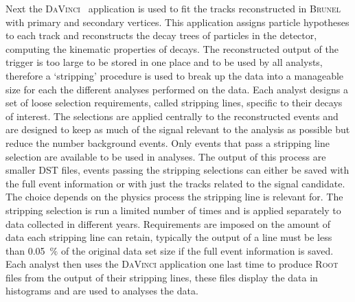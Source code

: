 Next the \textsc{DaVinci}~\cite{DV} application is used to fit the tracks reconstructed in \textsc{Brunel} with primary and secondary vertices. This application assigns particle hypotheses to each track and reconstructs the decay trees of particles in the detector, computing the kinematic properties of decays. The reconstructed output of the trigger is too large to be stored in one place and to be used by all analysts, therefore a `stripping' procedure is used to break up the data into a manageable size for each the different analyses performed on the data. Each analyst designs a set of loose selection requirements, called stripping lines, specific to their decays of interest. The selections are applied centrally to the reconstructed events and are designed to keep as much of the signal relevant to the analysis as possible but reduce the number background events. Only events that pass a stripping line selection are available to be used in analyses. The output of this process are smaller DST files, events passing the stripping selections can either be saved with the full event information or with just the tracks related to the signal candidate. The choice depends on the physics process the stripping line is relevant for. The stripping selection is run a limited number of times and is applied separately to data collected in different years. Requirements are imposed on the amount of data each stripping line can retain, typically the output of a line must be less than 0.05~$\%$ of the original data set size if the full event information is saved. Each analyst then uses the \textsc{DaVinci} application one last time to produce \textsc{Root}~\cite{Brun:1997pa} files from the output of their stripping lines, these files display the data in histograms and are used to analyses the data. %


